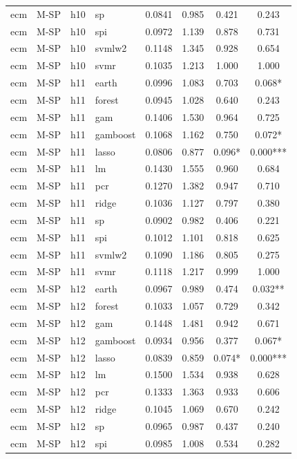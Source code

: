 \begin{ThreePartTable}
\begin{longtable}[t]{llclcccc}
ecm & M-SP & h10 & sp & 0.0841 & 0.985 & 0.421 & 0.243\\
ecm & M-SP & h10 & spi & 0.0972 & 1.139 & 0.878 & 0.731\\
ecm & M-SP & h10 & svmlw2 & 0.1148 & 1.345 & 0.928 & 0.654\\
ecm & M-SP & h10 & svmr & 0.1035 & 1.213 & 1.000 & 1.000\\
\addlinespace
ecm & M-SP & h11 & earth & 0.0996 & 1.083 & 0.703 & 0.068*\\
ecm & M-SP & h11 & forest & 0.0945 & 1.028 & 0.640 & 0.243\\
ecm & M-SP & h11 & gam & 0.1406 & 1.530 & 0.964 & 0.725\\
ecm & M-SP & h11 & gamboost & 0.1068 & 1.162 & 0.750 & 0.072*\\
ecm & M-SP & h11 & lasso & 0.0806 & 0.877 & 0.096* & 0.000***\\
ecm & M-SP & h11 & lm & 0.1430 & 1.555 & 0.960 & 0.684\\
ecm & M-SP & h11 & pcr & 0.1270 & 1.382 & 0.947 & 0.710\\
ecm & M-SP & h11 & ridge & 0.1036 & 1.127 & 0.797 & 0.380\\
ecm & M-SP & h11 & sp & 0.0902 & 0.982 & 0.406 & 0.221\\
ecm & M-SP & h11 & spi & 0.1012 & 1.101 & 0.818 & 0.625\\
ecm & M-SP & h11 & svmlw2 & 0.1090 & 1.186 & 0.805 & 0.275\\
ecm & M-SP & h11 & svmr & 0.1118 & 1.217 & 0.999 & 1.000\\
\addlinespace
ecm & M-SP & h12 & earth & 0.0967 & 0.989 & 0.474 & 0.032**\\
ecm & M-SP & h12 & forest & 0.1033 & 1.057 & 0.729 & 0.342\\
ecm & M-SP & h12 & gam & 0.1448 & 1.481 & 0.942 & 0.671\\
ecm & M-SP & h12 & gamboost & 0.0934 & 0.956 & 0.377 & 0.067*\\
ecm & M-SP & h12 & lasso & 0.0839 & 0.859 & 0.074* & 0.000***\\
ecm & M-SP & h12 & lm & 0.1500 & 1.534 & 0.938 & 0.628\\
ecm & M-SP & h12 & pcr & 0.1333 & 1.363 & 0.933 & 0.606\\
ecm & M-SP & h12 & ridge & 0.1045 & 1.069 & 0.670 & 0.242\\
ecm & M-SP & h12 & sp & 0.0965 & 0.987 & 0.437 & 0.240\\
ecm & M-SP & h12 & spi & 0.0985 & 1.008 & 0.534 & 0.282\\

\end{longtable}
\end{ThreePartTable}
